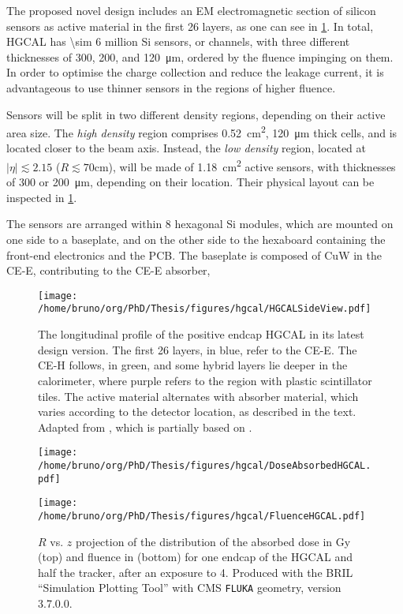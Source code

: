 \documentclass[11pt]{article}
\begin{document}
The proposed novel design includes an \ac{EM} electromagnetic section of silicon sensors as active material in the first \num{26} layers, as one can see in \cref{fig:hgcal_side_view}.
In total, \ac{HGCAL} has \num{\sim 6} million \ac{Si} sensors, or channels, with three different thicknesses of \num{300}, \num{200}, and \SI{120}{\micro\meter}, ordered by the fluence impinging on them.
In order to optimise the charge collection and reduce the leakage current, it is advantageous to use thinner sensors in the regions of higher fluence.

Sensors will be split in two different density regions, depending on their active area size.
The \emph{high density} region comprises \SI{0.52}{\centi\meter\squared}, \SI{120}{\micro\meter} thick cells, and is located closer to the beam axis.
Instead, the \emph{low density} region, located at \(|\eta| \lesssim 2.15\) (\(R \lesssim 70\si{\centi\meter}\)), will be made of \SI{1.18}{\centi\meter\squared} active sensors, with thicknesses of \num{300} or \SI{200}{\micro\meter}, depending on their location.
Their physical layout can be inspected in \cref{fig:hgcal_side_view}.

The sensors are arranged within \SI{8}{\inch} hexagonal \ac{Si} modules, which are mounted on one side to a baseplate, and on the other side to the hexaboard containing the front-end electronics and the \ac{PCB}. The baseplate is composed of CuW in the \ac{CE-E}, contributing to the \ac{CE-E} absorber,

\begin{figure}
\begin{center}
\texttt{[image: /home/bruno/org/PhD/Thesis/figures/hgcal/HGCALSideView.pdf]}
\end{center}
\caption{\label{fig:hgcal_side_view}The longitudinal profile of the positive endcap \ac{HGCAL} in its latest design version. The first \num{26} layers, in blue, refer to the \ac{CE-E}. The \ac{CE-H} follows, in green, and some hybrid layers lie deeper in the calorimeter, where purple refers to the region with plastic scintillator tiles. The active material alternates with absorber material, which varies according to the detector location, as described in the text. Adapted from \cite{hgcal_web}, which is partially based on \cite{hgcalTDR}.}
\end{figure}

\begin{figure}
\begin{center}
\texttt{[image: /home/bruno/org/PhD/Thesis/figures/hgcal/DoseAbsorbedHGCAL.pdf]}
\end{center}
\begin{center}
\texttt{[image: /home/bruno/org/PhD/Thesis/figures/hgcal/FluenceHGCAL.pdf]}
\end{center}
\caption{\label{fig:dose_fluence_hgcal}\(R\) vs. \(z\) projection of the distribution of the absorbed dose in \si{\gray} (top) and fluence in \si{\nequiv} (bottom) for one endcap of the \ac{HGCAL} and half the tracker, after an exposure to \SI{4}{\invab}. Produced with the \ac{BRIL} ``Simulation Plotting Tool'' \cite{bril_tool}  with \ac{CMS} \texttt{FLUKA} geometry, version 3.7.0.0.}
\end{figure}
\end{document}
